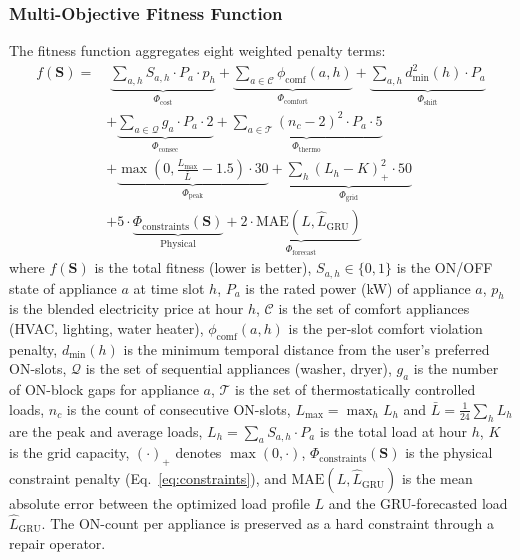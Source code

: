 \documentclass[journal]{IEEEtran}
\begin{document}
\subsubsection{Multi-Objective Fitness Function} The fitness function aggregates eight weighted penalty terms:
\begin{equation}
\begin{aligned}
    f(\mathbf{S}) = & \; \underbrace{\sum_{a,h} S_{a,h} \cdot P_a \cdot p_h}_{\Phi_{\text{cost}}} + \underbrace{\sum_{a \in \mathcal{C}} \phi_{\text{comf}}(a,h)}_{\Phi_{\text{comfort}}} + \underbrace{\sum_{a,h} d_{\min}^2(h) \cdot P_a}_{\Phi_{\text{shift}}} \\
    & + \underbrace{\sum_{a \in \mathcal{Q}} g_a \cdot P_a \cdot 2}_{\Phi_{\text{consec}}} + \underbrace{\sum_{a \in \mathcal{T}} (n_c - 2)^2 \cdot P_a \cdot 5}_{\Phi_{\text{thermo}}} \\
    & + \underbrace{\max\left(0, \frac{L_{\max}}{\bar{L}} - 1.5\right) \cdot 30}_{\Phi_{\text{peak}}} + \underbrace{\sum_h (L_h - K)_+^2 \cdot 50}_{\Phi_{\text{grid}}} \\
    & + 5 \cdot \underbrace{\Phi_{\text{constraints}}(\mathbf{S})}_{\text{Physical}} + \underbrace{2 \cdot \text{MAE}(L, \hat{L}_{\text{GRU}})}_{\Phi_{\text{forecast}}}
\end{aligned}
\label{eq:fitness}
\end{equation}
where $f(\mathbf{S})$ is the total fitness (lower is better), $S_{a,h} \in \{0,1\}$ is the ON/OFF state of appliance $a$ at time slot $h$, $P_a$ is the rated power (kW) of appliance $a$, $p_h$ is the blended electricity price at hour $h$, $\mathcal{C}$ is the set of comfort appliances (HVAC, lighting, water heater), $\phi_{\text{comf}}(a,h)$ is the per-slot comfort violation penalty, $d_{\min}(h)$ is the minimum temporal distance from the user's preferred ON-slots, $\mathcal{Q}$ is the set of sequential appliances (washer, dryer), $g_a$ is the number of ON-block gaps for appliance $a$, $\mathcal{T}$ is the set of thermostatically controlled loads, $n_c$ is the count of consecutive ON-slots, $L_{\max} = \max_h L_h$ and $\bar{L} = \frac{1}{24}\sum_h L_h$ are the peak and average loads, $L_h = \sum_a S_{a,h} \cdot P_a$ is the total load at hour $h$, $K$ is the grid capacity, $(\cdot)_+$ denotes $\max(0, \cdot)$, $\Phi_{\text{constraints}}(\mathbf{S})$ is the physical constraint penalty (Eq.~\eqref{eq:constraints}), and $\text{MAE}(L, \hat{L}_{\text{GRU}})$ is the mean absolute error between the optimized load profile $L$ and the GRU-forecasted load $\hat{L}_{\text{GRU}}$. The ON-count per appliance is preserved as a hard constraint through a repair operator.
\end{document}
